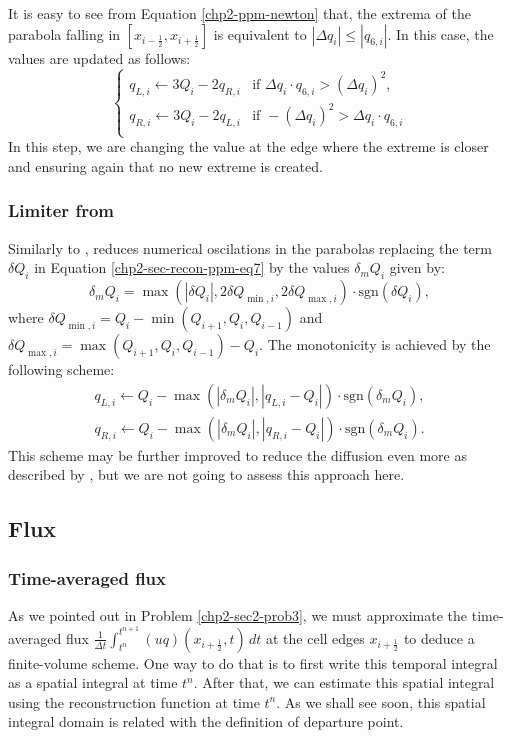 It is easy to see from Equation \eqref{chp2-ppm-newton} that, the extrema of the parabola falling in 
$[x_{i-\frac{1}{2}},x_{i+\frac{1}{2}}]$ is equivalent to $|\Delta q_i| \leq |q_{6,i}|$.
In this case, the values are updated as follows:
\begin{equation}
	\label{chp2-sec-mono-eq3}
	\begin{cases}
		q_{L,i} \leftarrow 3Q_i - 2q_{R,i}	& 
		\text{if } \Delta q_i \cdot q_{6,i} > (\Delta q_i)^2,\\
		q_{R,i} \leftarrow 3Q_i - 2q_{L,i}	& 
		\text{if } -(\Delta q_i)^2 > \Delta q_i\cdot q_{6,i} \\
	\end{cases}
\end{equation}
In this step, we are changing the value at the edge where the extreme is closer and ensuring
again that no new extreme is created.

\subsubsection{Limiter from \citet{lin:2004}}
	Similarly to \citet{colella:1984}, \citet{lin:2004} reduces numerical oscilations in the parabolas
replacing the term $\delta Q_i$ in Equation \eqref{chp2-sec-recon-ppm-eq7} by the values $\delta_m Q_i$ given by:
\begin{equation}
	\label{chp2-sec-mono-eq4}
	\delta_m Q_{i} =
	\max(|\delta Q_i|,2\delta Q_{\min,i},2\delta Q_{\max,i}) \cdot \text{sgn}(\delta Q_i), 
\end{equation}
where $\delta Q_{\min,i} = Q_i - \min(Q_{i+1},Q_i,Q_{i-1})$ and
$\delta Q_{\max,i} = \max(Q_{i+1},Q_i,Q_{i-1}) - Q_i$.
The monotonicity is achieved by the following scheme:	
\begin{align}
	\label{chp2-sec-mono-eq5}
	q_{L,i} \leftarrow Q_i - \max(|\delta_m Q_i|,|q_{L,i}-Q_i|) \cdot \text{sgn}(\delta_m Q_i),\\ 
	q_{R,i} \leftarrow Q_i - \max(|\delta_m Q_i|,|q_{R,i}-Q_i|) \cdot \text{sgn}(\delta_m Q_i). 
\end{align}
This scheme may be further improved to reduce the diffusion even more as described by \citet{lin:2004}, but
we are not going to assess this approach here.

\subsection{Flux}
\label{chp2-sec-flux}

\subsubsection{Time-averaged flux}
As we pointed out in  Problem \ref{chp2-sec2-prob3}, we must approximate the time-averaged flux 
$\frac{1}{\Delta t}\int_{t^n}^{t^{n+1}} (uq)(x_{i+\frac{1}{2}},t) \,dt$ at the cell edges $x_{i+\frac{1}{2}}$ 
to deduce a finite-volume scheme. One way to do that is to first write this temporal integral as 
a spatial integral at time $t^n$. After that, we can estimate this spatial integral
using the reconstruction function at time $t^n$. As we shall see soon, this spatial integral
domain is related with the definition of departure point.

